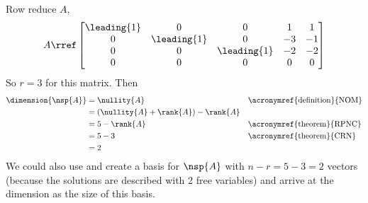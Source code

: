 Row reduce $A$,
%
\begin{equation*}
A\rref
\begin{bmatrix}
 \leading{1} & 0 & 0 & 1 & 1 \\
 0 & \leading{1} & 0 & -3 & -1 \\
 0 & 0 & \leading{1} & -2 & -2 \\
 0 & 0 & 0 & 0 & 0
\end{bmatrix}
\end{equation*}
%
So $r=3$ for this matrix.  Then
%
\begin{align*}
\dimension{\nsp{A}}
&=\nullity{A}&&\text{\acronymref{definition}{NOM}}\\
&=\left(\nullity{A}+\rank{A}\right)-\rank{A}\\
&=5-\rank{A}&&\text{\acronymref{theorem}{RPNC}}\\
&=5-3&&\text{\acronymref{theorem}{CRN}}\\
&=2
\end{align*}
%
We could also use  and create a basis for $\nsp{A}$ with $n-r=5-3=2$ vectors (because the solutions are described with 2 free variables) and arrive at the dimension as the size of this basis.
